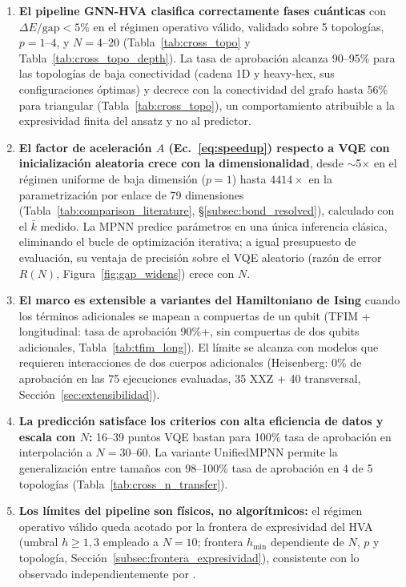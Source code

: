 \documentclass[11pt,a4paper,spanish]{book}
\begin{document}
\begin{enumerate}
    \item \textbf{El pipeline GNN-HVA clasifica correctamente fases cuánticas} con $\Delta E/\text{gap} < 5\%$ en el régimen operativo válido, validado sobre 5 topologías, $p = 1$--$4$, y $N = 4$--$20$ (Tabla~\ref{tab:cross_topo} y Tabla~\ref{tab:cross_topo_depth}). La tasa de aprobación alcanza 90--95\% para las topologías de baja conectividad (cadena 1D y heavy-hex, sus configuraciones óptimas) y decrece con la conectividad del grafo hasta 56\% para triangular (Tabla~\ref{tab:cross_topo}), un comportamiento atribuible a la expresividad finita del ansatz y no al predictor.

    \item \textbf{El factor de aceleración $A$ (Ec.~\ref{eq:speedup}) respecto a VQE con inicialización aleatoria crece con la dimensionalidad}, desde $\sim$5$\times$ en el régimen uniforme de baja dimensión ($p = 1$) hasta $4414\times$ en la parametrización por enlace de 79 dimensiones (Tabla~\ref{tab:comparison_literature}, §\ref{subsec:bond_resolved}), calculado con el $\bar{k}$ medido. La MPNN predice parámetros en una única inferencia clásica, eliminando el bucle de optimización iterativa; a igual presupuesto de evaluación, su ventaja de precisión sobre el VQE aleatorio (razón de error $R(N)$, Figura~\ref{fig:gap_widens}) crece con $N$.

    \item \textbf{El marco es extensible a variantes del Hamiltoniano de Ising} cuando los términos adicionales se mapean a compuertas de un qubit (TFIM + longitudinal: tasa de aprobación 90\%+, sin compuertas de dos qubits adicionales, Tabla~\ref{tab:tfim_long}). El límite se alcanza con modelos que requieren interacciones de dos cuerpos adicionales (Heisenberg: 0\% de aprobación en las 75 ejecuciones evaluadas, 35 XXZ + 40 transversal, Sección~\ref{sec:extensibilidad}).

    \item \textbf{La predicción satisface los criterios con alta eficiencia de datos y escala con $N$:} 16--39 puntos VQE bastan para 100\% tasa de aprobación en interpolación a $N = 30$--$60$. La variante UnifiedMPNN permite la generalización entre tamaños con 98--100\% tasa de aprobación en 4 de 5 topologías (Tabla~\ref{tab:cross_n_transfer}).

    \item \textbf{Los límites del pipeline son físicos, no algorítmicos:} el régimen operativo válido queda acotado por la frontera de expresividad del HVA (umbral $h \geq 1,3$ empleado a $N = 10$; frontera $h_{\min}$ dependiente de $N$, $p$ y topología, Sección~\ref{subsec:frontera_expresividad}), consistente con lo observado independientemente por \citet{tripathi2026}.
\end{enumerate}
\end{document}

